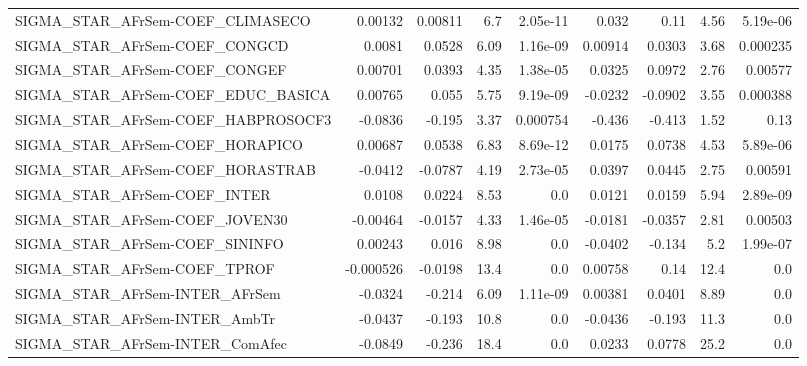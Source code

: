 \begin{tabular}{lrrrrrrrr}
SIGMA\_STAR\_AFrSem-COEF\_CLIMASECO       &     0.00132 &      0.00811 &      6.7 & 2.05e-11 &      0.032 &        0.11 &         4.56 &      5.19e-06 \\
SIGMA\_STAR\_AFrSem-COEF\_CONGCD          &      0.0081 &       0.0528 &     6.09 & 1.16e-09 &    0.00914 &      0.0303 &         3.68 &      0.000235 \\
SIGMA\_STAR\_AFrSem-COEF\_CONGEF          &     0.00701 &       0.0393 &     4.35 & 1.38e-05 &     0.0325 &      0.0972 &         2.76 &       0.00577 \\
SIGMA\_STAR\_AFrSem-COEF\_EDUC\_BASICA     &     0.00765 &        0.055 &     5.75 & 9.19e-09 &    -0.0232 &     -0.0902 &         3.55 &      0.000388 \\
SIGMA\_STAR\_AFrSem-COEF\_HABPROSOCF3     &     -0.0836 &       -0.195 &     3.37 & 0.000754 &     -0.436 &      -0.413 &         1.52 &          0.13 \\
SIGMA\_STAR\_AFrSem-COEF\_HORAPICO        &     0.00687 &       0.0538 &     6.83 & 8.69e-12 &     0.0175 &      0.0738 &         4.53 &      5.89e-06 \\
SIGMA\_STAR\_AFrSem-COEF\_HORASTRAB       &     -0.0412 &      -0.0787 &     4.19 & 2.73e-05 &     0.0397 &      0.0445 &         2.75 &       0.00591 \\
SIGMA\_STAR\_AFrSem-COEF\_INTER           &      0.0108 &       0.0224 &     8.53 &      0.0 &     0.0121 &      0.0159 &         5.94 &      2.89e-09 \\
SIGMA\_STAR\_AFrSem-COEF\_JOVEN30         &    -0.00464 &      -0.0157 &     4.33 & 1.46e-05 &    -0.0181 &     -0.0357 &         2.81 &       0.00503 \\
SIGMA\_STAR\_AFrSem-COEF\_SININFO         &     0.00243 &        0.016 &     8.98 &      0.0 &    -0.0402 &      -0.134 &          5.2 &      1.99e-07 \\
SIGMA\_STAR\_AFrSem-COEF\_TPROF           &   -0.000526 &      -0.0198 &     13.4 &      0.0 &    0.00758 &        0.14 &         12.4 &           0.0 \\
SIGMA\_STAR\_AFrSem-INTER\_AFrSem         &     -0.0324 &       -0.214 &     6.09 & 1.11e-09 &    0.00381 &      0.0401 &         8.89 &           0.0 \\
SIGMA\_STAR\_AFrSem-INTER\_AmbTr          &     -0.0437 &       -0.193 &     10.8 &      0.0 &    -0.0436 &      -0.193 &         11.3 &           0.0 \\
SIGMA\_STAR\_AFrSem-INTER\_ComAfec        &     -0.0849 &       -0.236 &     18.4 &      0.0 &     0.0233 &      0.0778 &         25.2 &           0.0 \\

\end{tabular}
